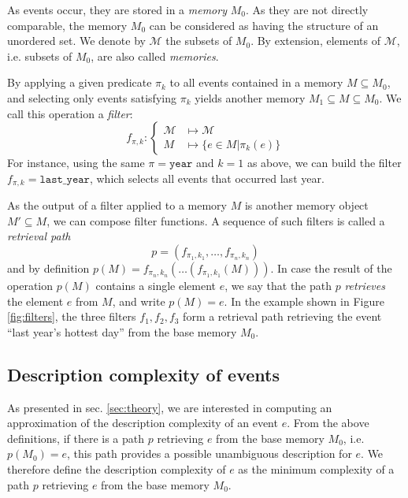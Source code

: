 \documentclass[conference]{IEEEtran}
\begin{document}
As events occur, they are stored in a \emph{memory} $M_0$. As they are not directly comparable, the memory $M_0$ can be considered as having the structure of an unordered set. We denote by $\mathcal{M}$ the subsets of $M_0$. By extension, elements of $\mathcal{M}$, i.e. subsets of $M_0$, are also called \emph{memories}.

By applying a given predicate $\pi_k$ to all events contained in a memory $M \subseteq M_0$, and selecting only events satisfying $\pi_k$ yields another memory $M_1 \subseteq M \subseteq M_0$. We call this operation a \emph{filter}:
\begin{equation}
  \label{eq:filter}
f_{\pi, k}: \begin{cases}
  \mathcal{M} & \mapsto \mathcal{M}             \\
  M           & \mapsto \{e \in M | \pi_k(e) \}
\end{cases}
\end{equation}
For instance, using the same $\pi = \mathtt{year}$ and $k=1$ as above, we can
build the filter $f_{\pi, k} = \mathtt{last\_{}year}$, which selects all events
that occurred last year.

As the output of a filter applied to a memory $M$ is another memory
object $M' \subseteq M$, we can compose filter
functions. A sequence of such filters is called a \emph{retrieval path}
\begin{equation}
\label{eq:ret_def}
p = (f_{\pi_{1}, k_{1}}, \dots, f_{\pi_{n}, k_{n}})
\end{equation}
and by definition
$p(M) = f_{\pi_{n}, k_{n}}(\dots(f_{\pi_{1}, k_{1}}(M)))$.
In case the result of the operation $p(M)$ contains a single element
$e$, we say that the path $p$ \emph{retrieves} the element $e$ from $M$, and write
$p(M) = e$. In the example shown in Figure \ref{fig:filters}, the three filters $f_1, f_2, f_3$ form a retrieval path retrieving the event ``last year's hottest day'' from the base memory $M_0$.

\subsection{Description complexity of events}

As presented in sec. \ref{sec:theory}, we are interested in computing an approximation of the description complexity of an event $e$. From the above definitions, if there is a path $p$ retrieving $e$ from the base memory $M_0$, i.e. $p(M_0) = e$, this path provides a possible unambiguous description for $e$. We therefore define the description complexity of $e$ as the minimum complexity of a path $p$ retrieving $e$ from the base memory $M_0$.
\end{document}
